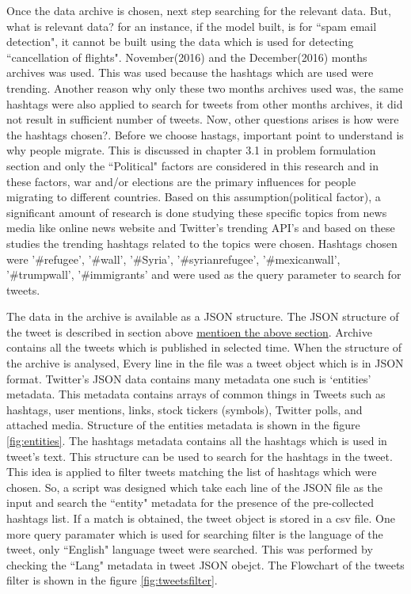 Once the data archive is chosen, next step searching for the relevant data. But, what is relevant data? for an instance, if the model built, is for ``spam email detection", it cannot be built using the data which is used for detecting ``cancellation of flights". November(2016) and the December(2016) months archives was used. This was used because the hashtags which are used were trending. Another reason why only these  two months archives used was, the same hashtags were also applied to search for tweets from other months archives, it did not result in sufficient number of tweets. Now, other questions arises is how were the hashtags chosen?. Before we choose hastags, important point to understand is why people migrate. This is discussed in chapter 3.1 in problem formulation section and only the ``Political" factors are considered in this research and in these factors, war and/or elections are the primary influences for people migrating to different countries. Based on this assumption(political factor), a significant amount of research is done studying these specific topics from news media like online news website and Twitter's trending API's and based on these studies the trending hashtags related to the topics were chosen. Hashtags chosen were ’\#refugee’, ’\#wall’, ’\#Syria’, ’\#syrianrefugee’, ’\#mexicanwall’, ’\#trumpwall’, ’\#immigrants’ and were used as the query parameter to search for tweets. 

The data in the archive is available as a JSON structure. The JSON structure of the tweet is described in section above \underline{mentioen the above section}. Archive contains all the tweets which is published in selected time. When the structure of the archive is analysed, Every line in the file was a tweet object which is in JSON format. Twitter's JSON data contains many metadata one such is `entities' metadata. This metadata contains arrays of common things in Tweets such as hashtags, user mentions, links, stock tickers (symbols), Twitter polls, and attached media. Structure of the entities metadata is shown in the figure \ref{fig:entities}. The hashtags metadata contains all the hashtags which is used in tweet's text. This structure can be used to search for the hashtags in the tweet. This idea is applied to filter tweets matching the list of hashtags which were chosen. So, a script was designed which take each line of the JSON file as the input and search the ``entity" metadata for the presence of the pre-collected hashtags list. If a match is obtained, the tweet object is stored in a csv file. One more query paramater which is used for searching filter is the language of the tweet, only ``English" language tweet were searched. This was performed by checking the ``Lang" metadata in tweet JSON obejct. The Flowchart of the tweets filter is shown in the figure \ref{fig:tweetsfilter}.


